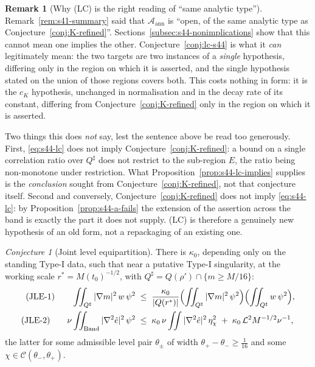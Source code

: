 \documentclass[11pt]{article}
\theoremstyle{definition}
\newtheorem{remark}[theorem]{Remark}
\theoremstyle{remark}
\newtheorem{conjecture}[theorem]{Conjecture}
\begin{document}
\begin{remark}[Why (LC) is the right reading of ``same analytic type'']
  \label{rem:s44-lc-reading}
  Remark~\ref{rem:s41-summary} said that $\mathcal{A}_{\mathrm{ann}}$ is
  ``open, of the same analytic type as Conjecture~\ref{conj:K-refined}''.
  Sections~\ref{subsec:s44-nonimplications} show that this cannot mean one
  implies the other. Conjecture~\ref{conj:lc-s44} is what it \emph{can}
  legitimately mean: the two targets are two instances of a \emph{single}
  hypothesis, differing only in the region on which it is asserted, and the
  single hypothesis stated on the union of those regions covers both. This
  costs nothing in form: it is the $c_K$ hypothesis, unchanged in
  normalisation and in the decay rate of its constant, differing from
  Conjecture~\ref{conj:K-refined} only in the region on which it is asserted.

  Two things this does \emph{not} say, lest the sentence above be read too
  generously. First, \eqref{eq:s44-lc} does not imply
  Conjecture~\ref{conj:K-refined}: a bound on a single correlation ratio over
  $Q^\sharp$ does not restrict to the sub-region $E$, the ratio being
  non-monotone under restriction. What
  Proposition~\ref{prop:s44-lc-implies} supplies is the \emph{conclusion}
  sought from Conjecture~\ref{conj:K-refined}, not that conjecture itself.
  Second and conversely, Conjecture~\ref{conj:K-refined} does not imply
  \eqref{eq:s44-lc}: by Proposition~\ref{prop:s44-a-fails} the extension of
  the assertion across the band is exactly the part it does not supply. (LC)
  is therefore a genuinely new hypothesis of an old form, not a repackaging of
  an existing one.
\end{remark}

\begin{conjecture}[Joint level equipartition]\label{conj:jle-s44}
  There is $\kappa_0$, depending only on the standing Type-I data, such that
  near a putative Type-I singularity, at the working scale
  $r^*=M(t_0)^{-1/2}$, with $Q^\sharp=Q(\rho')\cap\{m\geq M/16\}$:
  \begin{align}
    \textup{(JLE-1)}\qquad
    \iint_{Q^\sharp}|\nabla m|^2\,w\,\psi^2
    &\;\leq\;\frac{\kappa_0}{|Q(r^*)|}
      \Bigl(\iint_{Q^\sharp}|\nabla m|^2\,\psi^2\Bigr)
      \Bigl(\iint_{Q^\sharp}w\,\psi^2\Bigr) ,
      \label{eq:s44-jle}\\
    \textup{(JLE-2)}\qquad
    \nu\iint_{\mathrm{Band}}|\nabla^2\hat{e}|^2\,\psi^2
    &\;\leq\;\kappa_0\,\nu\iint|\nabla^2\hat{e}|^2\,\eta_\chi^2
      \;+\;\kappa_0\,\mathcal{L}^2M^{-1/2}\nu^{-1} ,
      \label{eq:s44-jle2}
  \end{align}
  the latter for some admissible level pair $\theta_\pm$ of width
  $\theta_+-\theta_-\geq\tfrac1{16}$ and some
  $\chi\in\mathcal{C}(\theta_-,\theta_+)$.
\end{conjecture}
\end{document}

